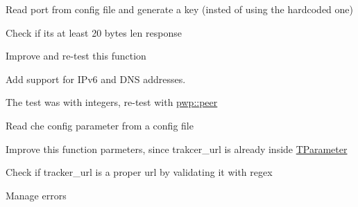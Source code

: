 
\begin{DoxyRefList}
\item[\label{todo__todo000006}%
\Hypertarget{todo__todo000006}%
Member \hyperlink{namespacet__udp_a5e968355a7c45dae0749b80e1be8308a}{t\+\_\+udp\+:\+:get\+\_\+announce\+\_\+req} (std\+::vector$<$ uint8\+\_\+t $>$ \&req, const \hyperlink{structtracker_1_1TParameter}{tracker\+::\+T\+Parameter} \&param, std\+::vector$<$ uint8\+\_\+t $>$ \&conn\+\_\+id\+\_\+v)]Read port from config file and generate a key (insted of using the hardcoded one) 
\item[\label{todo__todo000007}%
\Hypertarget{todo__todo000007}%
Member \hyperlink{namespacet__udp_a1f2a0ab9801cbc55002e67c166895a0e}{t\+\_\+udp\+:\+:parse\+\_\+announce\+\_\+resp} (std\+::vector$<$ uint8\+\_\+t $>$ \&resp, \hyperlink{namespacepwp_ad07fa6df116b205302ad5ec172277184}{pwp\+::\+Peer\+List} peer\+\_\+list)]Check if it\textquotesingle{}s at least 20 bytes len response 
\item[\label{todo__todo000005}%
\Hypertarget{todo__todo000005}%
Member \hyperlink{namespacetracker_ae542bb4bf17f34b8cadc3a4ae2f5ced2}{tracker\+:\+:is\+\_\+compact\+\_\+response} (const string $\ast$response)]Improve and re-\/test this function 
\item[\label{todo__todo000004}%
\Hypertarget{todo__todo000004}%
Member \hyperlink{namespacetracker_a38d52cf6dd86f2a26a719e285097c805}{tracker\+:\+:parse\+\_\+dict\+\_\+peer} (\hyperlink{structbe__node}{be\+\_\+node} $\ast$node, \hyperlink{namespacepwp_ad07fa6df116b205302ad5ec172277184}{pwp\+::\+Peer\+List} peer\+\_\+list)]Add support for I\+Pv6 and D\+NS addresses. 
\item[\label{todo__todo000002}%
\Hypertarget{todo__todo000002}%
Member \hyperlink{namespacetracker_ab1ce1ce0570dd4742e06b6941f63dbe4}{tracker\+:\+:remove\+\_\+duplicate\+\_\+peers} (\hyperlink{namespacepwp_ad07fa6df116b205302ad5ec172277184}{pwp\+::\+Peer\+List} \&peer\+\_\+list)]The test was with integers, re-\/test with \hyperlink{structpwp_1_1peer}{pwp\+::peer} 
\item[\label{todo__todo000001}%
\Hypertarget{todo__todo000001}%
Member \hyperlink{namespacetracker_afbc30ba2b5f62968e92fedaaa8eab454}{tracker\+:\+:start\+\_\+tracker\+\_\+request} (\hyperlink{structtracker_1_1TParameter}{T\+Parameter} $\ast$param, const T\+List \&tracker\+\_\+list, \hyperlink{namespacepwp_ad07fa6df116b205302ad5ec172277184}{pwp\+::\+Peer\+List} peer\+\_\+list)]Read che config parameter from a config file 
\item[\label{todo__todo000003}%
\Hypertarget{todo__todo000003}%
Member \hyperlink{namespacetracker_a60c22f265981fba0a5dad14d6d3d516a}{tracker\+:\+:url\+\_\+builder} (const string \&tracker\+\_\+url, const \hyperlink{structtracker_1_1TParameter}{T\+Parameter} \&t\+\_\+param, event\+\_\+type event, const string \&tracker\+\_\+key, C\+U\+RL $\ast$curl, bool tls)]Improve this function parmeters, since trakcer\+\_\+url is already inside \hyperlink{structtracker_1_1TParameter}{T\+Parameter} 

Check if tracker\+\_\+url is a proper url by validating it with regex 

Manage errors
\end{DoxyRefList}